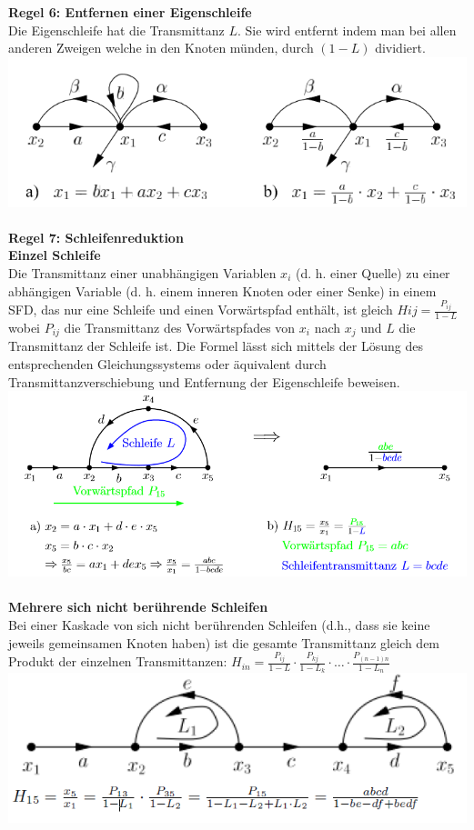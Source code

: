 \noindent\textbf{Regel 6: Entfernen einer Eigenschleife}\\
 Die Eigenschleife hat die Transmittanz $L$. Sie wird entfernt
indem man bei allen anderen Zweigen welche in den Knoten
münden, durch $(1 - L)$ dividiert.\\
\includegraphics[width=\columnwidth]{Images/sfd_r6}~\\

\noindent\textbf{Regel 7: Schleifenreduktion}\\
\textbf{Einzel Schleife}\\
Die Transmittanz einer unabhängigen Variablen $x_i$ (d. h. einer
Quelle) zu einer abhängigen Variable (d. h. einem inneren
Knoten oder einer Senke) in einem SFD, das nur eine Schleife
und einen Vorwärtspfad enthält, ist gleich $Hij = \frac{P_{ij}}{1 - L}$ wobei
$P_{ij}$ die Transmittanz des Vorwärtspfades von $x_i$ nach $x_j$ und
$L$ die Transmittanz der Schleife ist. Die Formel lässt sich mittels
der Lösung des entsprechenden Gleichungssystems oder äquivalent 
durch Transmittanzverschiebung und Entfernung
der Eigenschleife beweisen.\\
\includegraphics[width=\columnwidth]{Images/sfd_r7}~\\

\textbf{Mehrere sich nicht berührende Schleifen}\\
Bei einer Kaskade von sich nicht berührenden Schleifen (d.h.,
dass sie keine jeweils gemeinsamen Knoten haben) ist
die gesamte Transmittanz gleich dem Produkt der einzelnen
Transmittanzen: $H_{in} = \frac{P_{ij}}{1-L} \cdot \frac{P_{kj}}{1-L_k}\cdot \dots \cdot \frac{P_{(n-1)n}}{1-L_n}$\\
\includegraphics[width=\columnwidth]{Images/sfd_r7b}~\\

